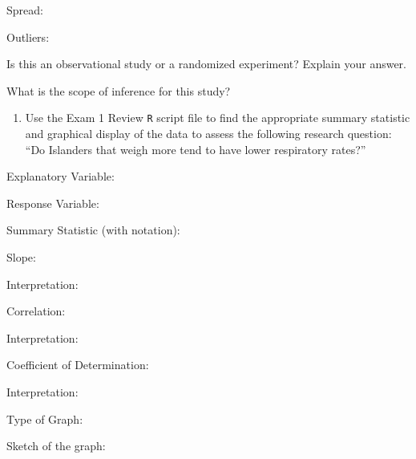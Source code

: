 \documentclass[
]{report}
\providecommand{\tightlist}{%
  \setlength{\itemsep}{0pt}\setlength{\parskip}{0pt}}
\newcommand{\rgi}{\hspace{24pt}}  %
\begin{document}
\rgi \rgi Spread:

\vspace{0.2in}

\rgi \rgi Outliers:

\vspace{0.2in}

\rgi Is this an observational study or a randomized experiment? Explain your answer.

\vspace{0.5in}

\rgi What is the scope of inference for this study?

\newpage

\begin{enumerate}
\def\labelenumi{\arabic{enumi}.}
\setcounter{enumi}{7}
\tightlist
\item
  Use the Exam 1 Review \texttt{R} script file to find the appropriate summary statistic and graphical display of the data to assess the following research question: ``Do Islanders that weigh more tend to have lower respiratory rates?''
\end{enumerate}

\rgi Explanatory Variable:

\rgi Response Variable:

\rgi Summary Statistic (with notation):

\rgi Slope:

\vspace{0.2in}

\rgi \rgi Interpretation:

\vspace{0.3in}

\rgi Correlation:

\vspace{0.2in}

\rgi \rgi Interpretation:

\vspace{0.3in}

\rgi Coefficient of Determination:

\vspace{0.2in}

\rgi \rgi Interpretation:

\vspace{0.3in}

\rgi Type of Graph:

\vspace{0.3in}

\rgi Sketch of the graph:

\vspace{2in}
\end{document}
